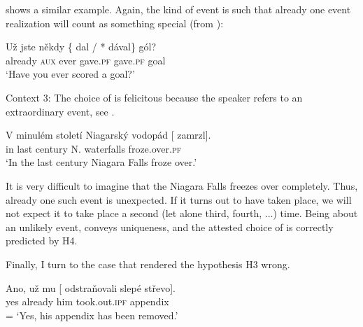 \documentclass[output=paper,modfonts,newtxmath,hidelinks]{langscibook}
\begin{document}
 shows a similar example. Again, the kind of event is such that already one event realization will count as something special 
(from \citealt[115]{FK18}):

\begin{exe}
\ex\label{13:gol}
\gll U\v{z} jste n\v{e}kdy \{\hspace{-2pt} dal / *\hspace{-2pt} d\'aval\}   g\'ol? \\
already \textsc{aux} ever {} gave.\textsc{pf} {} {} gave.\textsc{pf} goal\\
\glt `Have you ever scored a goal?'
\end{exe}

\noindent Context 3: The choice of  is felicitous because the speaker refers to an extraordinary event, see . 

\begin{exe}
\ex\label{13:lakerep}
\gll V minul\'em stolet\'i Niagarsk\'y vodop\'ad [ zamrzl]. \\
in last century N. waterfalls {} froze.over.\textsc{pf}\\
\glt `In the last century Niagara Falls froze over.'
\end{exe}

\noindent It is very difficult to imagine that the Niagara Falls freezes over completely. 
Thus, already one such event is unexpected. If it turns out to have taken place, 
we will not expect it to take place a second (let alone third, fourth, ...) time. Being about an unlikely event,  conveys uniqueness,
and the attested choice of  is correctly predicted by H4. 


Finally, I turn to the case that rendered the hypothesis H3 wrong. 


\begin{exe}
\ex\label{13:blinddarm3}
\gll Ano, u\v{z} mu [ odstra\v{n}ovali {slep\'e st\v{r}evo}].\\
yes already him {} took.out.\textsc{ipf} appendix \\\hfill = 
\glt `Yes, his appendix has been removed.'
\end{exe}
\end{document}
